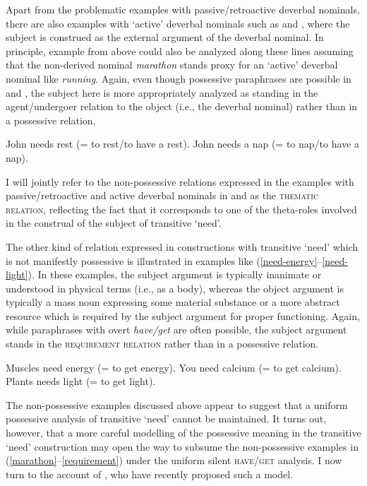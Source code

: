 \documentclass[output=paper]{langscibook}
\begin{document}
\noindent Apart from the problematic examples with passive/retroactive deverbal nominals, there are also examples with `active' deverbal nominals such as  and , where the subject is construed as the external argument of the deverbal nominal. In principle,  example  from above could also be analyzed along these lines assuming that the non-derived nominal \textit{marathon} stands proxy for an `active' deverbal nominal like \textit{running}. Again, even though possessive paraphrases are possible in  and , the subject here is more appropriately analyzed as standing in the agent/undergoer relation to the object (i.e., the deverbal nominal) rather than in a possessive relation.

\ea\label{active}
\ea John needs rest (= to rest/to have a rest).\label{need-rest}
\ex  John needs a nap (= to nap/to have a nap).\label{need-nap}
\z\z

\noindent I will jointly refer to the non-possessive relations expressed in the examples with passive/retroactive and active deverbal nominals in  and  as the \textsc{thematic relation}, reflecting the fact that it corresponds to one of the theta-roles involved in the construal of the subject of transitive `need'.

The other kind of relation expressed in constructions with transitive `need' which is not manifestly possessive is illustrated in examples like (\ref{need-energy}--\ref{need-light}). In these examples, the subject argument is typically inanimate or understood in physical terms (i.e., as a body), whereas the object argument is typically a mass noun expressing some material substance or a more abstract resource which is required by the subject argument for proper functioning. Again, while paraphrases with overt \textit{have/get} are often possible, the subject argument stands in the \textsc{requirement relation} rather than in a possessive relation.

    \largerpage[-1] %

\ea\label{requirement}
\ea Muscles need energy (= to get energy).\label{need-energy}
\ex You need calcium (= to get calcium).\label{need-calcium}
\ex Plants needs light (= to get light).\label{need-light}
\z\z

\noindent The non-possessive examples discussed above appear to suggest that a uniform possessive analysis of transitive `need' cannot be maintained. It turns out, however, that a more careful modelling of the possessive meaning in the transitive `need' construction may open the way to subsume the non-possessive examples in (\ref{marathon}--\ref{requirement}) under the uniform silent \textsc{have/get} analysis. I now turn to the account of \citet{Zaroukian.Beller2013}, who have recently proposed such a model.
\end{document}
